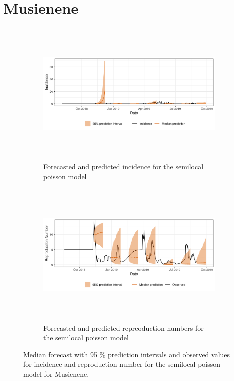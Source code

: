  \section{ Musienene }\begin{figure}[H]\begin{subfigure}{\textwidth}  \centering  \includegraphics[width=0.9\linewidth, height=7cm]{../output/Musienene_predictions.png}  \caption{Forecasted and predicted incidence for the semilocal poisson model}\end{subfigure}

\begin{subfigure}{\textwidth}  \centering  \includegraphics[width=0.9\linewidth, height=7cm]{../output/Musienene_Rs.png}  \caption{Forecasted and predicted repreoduction numbers for the semilocal poisson model}\end{subfigure}  \caption{Median forecast with 95 \% prediction intervals and observed values for incidence and reproduction number for the semilocal poisson model for Musienene.}\end{figure}

